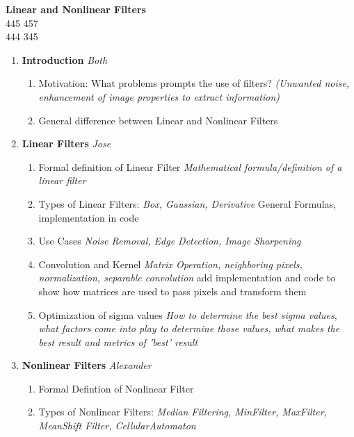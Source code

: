 \documentclass{article}
\begin{document}
    \begin{center} 
        \textbf{\LARGE{Linear and Nonlinear Filters}}\\
        \large{} 445 457\\
         444 345
    \end{center}
    \large\begin{enumerate}[label=\Roman*.]
        \item \textbf{Introduction} \emph{Both}
            \begin{enumerate}[label=\arabic*.]
                \item Motivation: What problems prompts the use of filters?
                    \textit{(Unwanted noise, enhancement of image properties to extract information)}
                \item General difference between Linear and Nonlinear Filters
            \end{enumerate}
        \item \textbf{Linear Filters} \emph{Jose}
            \begin{enumerate}[label=\arabic*.]
                \item Formal definition of Linear Filter \textit{Mathematical formula/definition of a linear filter}
                \item Types of Linear Filters: \textit{Box, Gaussian, Derivative} General Formulas, implementation in code
                \item Use Cases \textit{ Noise Removal, Edge Detection, Image Sharpening}
                \item Convolution and Kernel \textit{Matrix Operation, neighboring pixels, normalization, separable convolution}
                    add implementation and code to show how matrices are used to pass pixels and transform them
                \item Optimization of sigma values \textit{How to determine the best sigma values,
                    what factors come into play to determine those values, what makes the best result and metrics of 'best' result}
            \end{enumerate}
        \item \textbf{Nonlinear Filters} \emph{Alexander}
            \begin{enumerate}[label=\arabic*.]
                \item Formal Defintion of Nonlinear Filter
                \item Types of Nonlinear Filters: \textit{Median Filtering, MinFilter, MaxFilter, MeanShift Filter, CellularAutomaton}

\end{enumerate}
\end{enumerate}
\end{document}

